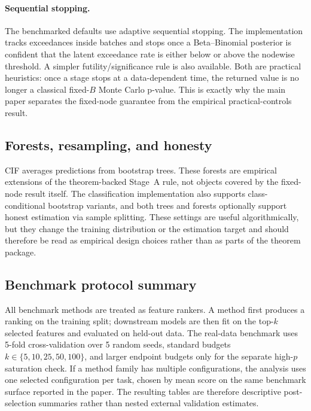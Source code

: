 \paragraph{Sequential stopping.}
The benchmarked defaults use adaptive sequential stopping. The implementation
tracks exceedances inside batches and stops once a Beta--Binomial posterior is
confident that the latent exceedance rate is either below or above the nodewise
threshold. A simpler futility/significance rule is also available. Both are
practical heuristics: once a stage stops at a data-dependent time, the returned
value is no longer a classical fixed-$B$ Monte Carlo p-value. This is exactly
why the main paper separates the fixed-node guarantee from the empirical
practical-controls result.

\subsection{Forests, resampling, and honesty}

CIF averages predictions from bootstrap trees. These forests are empirical
extensions of the theorem-backed Stage~A rule, not objects covered by the
fixed-node result itself. The classification implementation also supports
class-conditional bootstrap variants, and both trees and forests optionally
support honest estimation via sample splitting. These settings are useful
algorithmically, but they change the training distribution or the estimation
target and should therefore be read as empirical design choices rather than as
parts of the theorem package.

\subsection{Benchmark protocol summary}

All benchmark methods are treated as feature rankers. A method first produces a
ranking on the training split; downstream models are then fit on the top-$k$
selected features and evaluated on held-out data. The real-data benchmark uses
5-fold cross-validation over 5 random seeds, standard budgets
$k \in \{5,10,25,50,100\}$, and larger endpoint budgets only for the separate
high-$p$ saturation check. If a method family has multiple configurations, the
analysis uses one selected configuration per task, chosen by mean score on the
same benchmark surface reported in the paper. The resulting tables are therefore
descriptive post-selection summaries rather than nested external validation
estimates.


